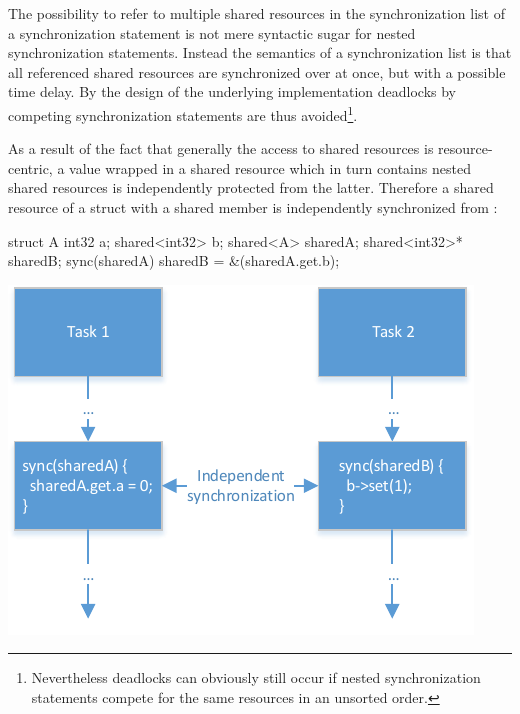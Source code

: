 The possibility to refer to multiple shared resources in the synchronization list of a synchronization statement is not mere syntactic sugar for nested synchronization statements. Instead the semantics of a synchronization list is that all referenced shared resources are synchronized over at once, but with a possible time delay. By the design of the underlying implementation deadlocks by competing synchronization statements are thus avoided\footnote{Nevertheless deadlocks can obviously still occur if nested synchronization statements compete for the same resources in an unsorted order.}.

As a result of the fact that generally the access to shared resources is resource-centric, a value wrapped in a shared resource which in turn contains nested shared resources is independently protected from the latter. Therefore a shared resource of a struct with a shared member  is independently synchronized from :

\vspace{0.5cm}
\begin{minipage}{0.35\textwidth}
\begin{ccode}
struct A {
  int32 a;
  shared<int32> b; 
}
shared<A> sharedA;
shared<int32>* sharedB;
sync(sharedA) { sharedB = &(sharedA.get.b); }
\end{ccode}
\end{minipage}
\begin{minipage}{0.2\textwidth}
\begin{center}
\end{center}
\end{minipage}
\begin{minipage}{0.35\textwidth}
\includegraphics[scale=.9]{pics/ParallelExecution}
\end{minipage}

